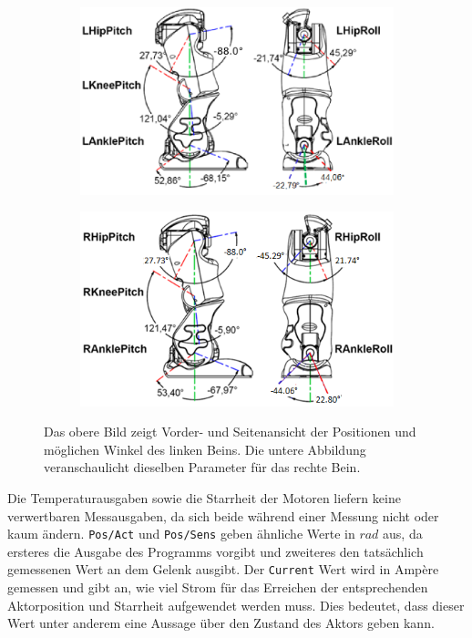 \begin{figure}[b!]
	\hfill
	\begin{subfigure}[c]{\linewidth}
		\centering
		\includegraphics[width=0.7\linewidth]{Bilder/hardware_llegjoint.png}
	\end{subfigure}
	\begin{subfigure}[c]{\linewidth}
		\centering
		\includegraphics[width=0.7\linewidth]{Bilder/hardware_rlegjoint.png}
	\end{subfigure}
	\hfill
	\caption{Das obere Bild zeigt Vorder- und Seitenansicht der Positionen und möglichen Winkel des linken Beins. Die untere Abbildung veranschaulicht dieselben Parameter für das rechte Bein. \cite[in /kinematics-data/joints]{nao_docu_dev_guide}}
	\label{hardware_legjoint}
\end{figure}

Die Temperaturausgaben sowie die Starrheit der Motoren liefern keine verwertbaren Messausgaben, da sich beide während einer Messung nicht oder kaum ändern. \texttt{Pos/Act} und \texttt{Pos/Sens} geben ähnliche Werte in $\unit{rad}$ aus, da ersteres die Ausgabe des Programms vorgibt und zweiteres den tatsächlich gemessenen Wert an dem Gelenk ausgibt. Der \texttt{Current} Wert wird in Ampère gemessen und gibt an, wie viel Strom für das Erreichen der entsprechenden Aktorposition und Starrheit aufgewendet werden muss. Dies bedeutet, dass dieser Wert unter anderem eine Aussage über den Zustand des Aktors geben kann. 

